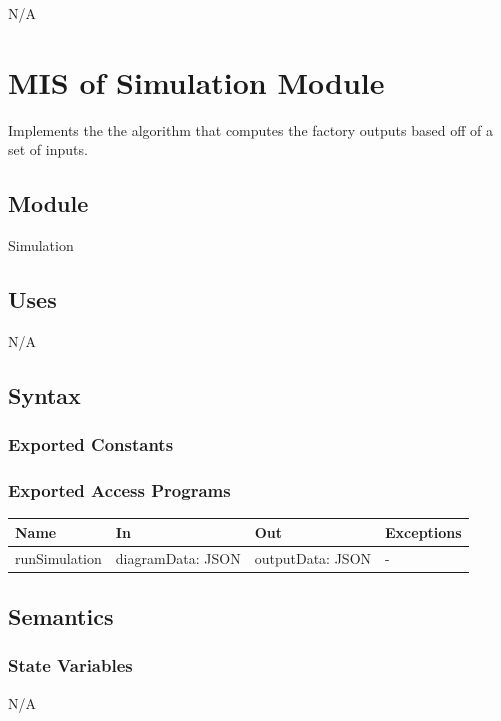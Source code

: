 \documentclass[12pt, titlepage]{article}
\begin{document}
N/A

\newpage

\section{MIS of Simulation Module} \label{mSimulation} 
Implements the the algorithm that computes the factory outputs based off of a set of inputs.

\subsection{Module}

Simulation

\subsection{Uses}
N/A

\subsection{Syntax}

\subsubsection{Exported Constants}

\subsubsection{Exported Access Programs}

\begin{center}
\begin{tabular}{p{2cm} p{4cm} p{4cm} p{2cm}}
\hline
\textbf{Name} & \textbf{In} & \textbf{Out} & \textbf{Exceptions} \\
\hline
runSimulation & diagramData: JSON & outputData: JSON & - \\
\hline
\end{tabular}
\end{center}

\subsection{Semantics}

\subsubsection{State Variables}
N/A
\end{document}
